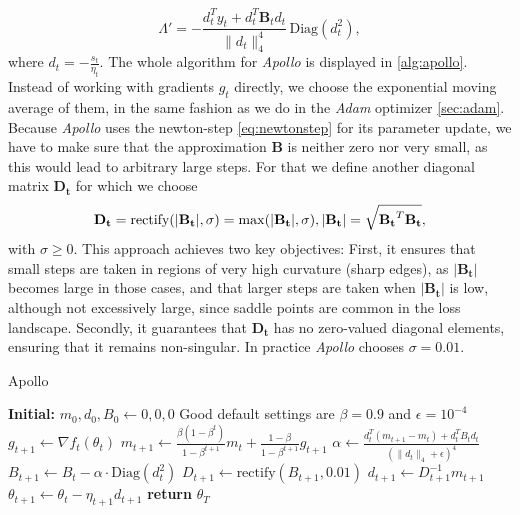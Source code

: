 \begin{equation}
    \Lambda' = - \frac{d_t^T y_t + d_t^T \mathbf{B}_t d_t}{\|d_t\|_4^4} \, \text{Diag}(d_t^2),
\end{equation}
where \( d_t = - \frac{s_t}{\eta_t} \). The whole algorithm for \emph{Apollo} is displayed in \ref{alg:apollo}.
Instead of working with gradients \( g_t \) directly, we choose the exponential moving average of them, in the
same fashion as we do in the \emph{Adam} optimizer \ref{sec:adam}. Because \emph{Apollo} uses the newton-step \ref{eq:newtonstep}
for its parameter update, we have to make sure that the approximation $ \mathbf{B}$ is neither zero nor very small, as this would lead to arbitrary large steps.
For that we define another diagonal matrix $ \mathbf{D_t}$ for which we choose
\begin{equation}
    \mathbf{D_t} =  \text{rectify}(|\mathbf{B_t}|,\sigma) = \max(|\mathbf{B_t}|,\sigma), \\ |\mathbf{B_t}| = \sqrt{\mathbf{B_t}^T\mathbf{B_t}},
\end{equation}
with $\sigma \geq 0$.
This approach achieves two key objectives: First, it ensures that small steps are taken in regions of very high curvature (sharp edges),
as \( |\mathbf{B_t}| \) becomes large in those cases, and that larger steps are taken when \( |\mathbf{B_t}| \) is low, although not excessively large, since saddle points are common in the loss landscape.
Secondly, it guarantees that \( \mathbf{D_t} \) has no zero-valued diagonal elements, ensuring that it remains non-singular.
In practice \emph{Apollo} chooses $\sigma=0.01$.\cite{apollo}

\label{alg:apollo}
\begin{algorithm}
    \caption{Apollo}
    \begin{algorithmic}[1]
    \State \textbf{Initial:} $m_0, d_0, B_0 \leftarrow 0, 0, 0$ 
    \State Good default settings are $\beta = 0.9$ and $\epsilon = 10^{-4}$
            \State $g_{t+1} \leftarrow \nabla f_t(\theta_t)$ 
            \State $m_{t+1} \leftarrow \frac{\beta(1-\beta^t)}{1-\beta^{t+1}}m_t + \frac{1-\beta}{1-\beta^{t+1}}g_{t+1}$ 
            \State $\alpha \leftarrow \frac{d_t^T(m_{t+1}-m_t)+d_t^TB_td_t}{(\|d_t\|_4+\epsilon)^4}$ 
            \State $B_{t+1} \leftarrow B_t - \alpha \cdot \text{Diag}(d_t^2)$ 
            \State $D_{t+1} \leftarrow \text{rectify}(B_{t+1}, 0.01)$ 
            \State $d_{t+1} \leftarrow D_{t+1}^{-1}m_{t+1}$ 
            \State $\theta_{t+1} \leftarrow \theta_t - \eta_{t+1}d_{t+1}$ 
        \EndFor
    \EndWhile
    \State \textbf{return} $\theta_T$
    \end{algorithmic}
    \end{algorithm}

